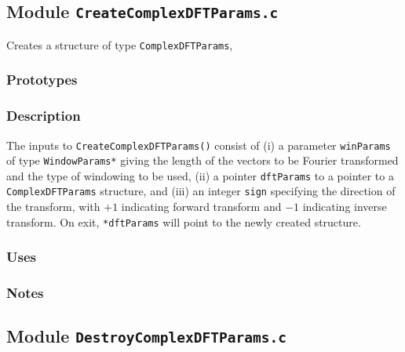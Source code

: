 \vfill{\footnotesize}

\newpage
\subsection{Module \texttt{CreateComplexDFTParams.c}}
\label{ss:CreateComplexDFTParams.c}

Creates a structure of type \verb+ComplexDFTParams+,

\subsubsection*{Prototypes}
\vspace{0.1in}


\subsubsection*{Description}

The inputs to \verb+CreateComplexDFTParams()+ consist of (i) a parameter
\verb+winParams+ of type \verb+WindowParams*+ giving the length of the vectors
to be Fourier  transformed and the type of windowing to be used, (ii) a
pointer \verb+dftParams+ to a pointer to a \verb+ComplexDFTParams+ structure, and
(iii) an integer \verb+sign+ specifying the direction of the transform, with
$+1$ indicating forward transform and $-1$ indicating inverse transform.  On
exit, \verb+*dftParams+ will point to the newly created structure.

\subsubsection*{Uses}

\subsubsection*{Notes}

\vfill{\footnotesize}

\newpage
\subsection{Module \texttt{DestroyComplexDFTParams.c}}
\label{ss:DestroyComplexDFTParams.c}

